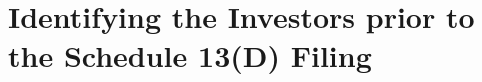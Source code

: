 \documentclass[12pt]{article}
\begin{document}

\section{Identifying the Investors prior to the Schedule 13(D) Filing}
\end{document}

